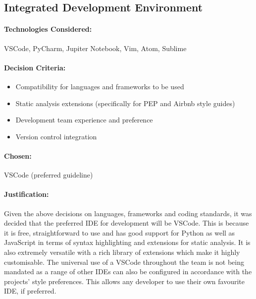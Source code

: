 \begin{spacing}{1.3}
\subsection{Integrated Development Environment}
\paragraph{Technologies Considered:}
VSCode, PyCharm, Jupiter Notebook, Vim, Atom, Sublime
\paragraph{Decision Criteria:}
\begin{itemize}
\item Compatibility for languages and frameworks to be used
\item Static analysis extensions (specifically for PEP and Airbnb style guides)
\item Development team experience and preference
\item Version control integration
\end{itemize}

\paragraph{Chosen:}
VSCode (preferred guideline)

\paragraph{Justification:}
Given the above decisions on languages, frameworks and coding standards, it was decided that the preferred IDE for development will be VSCode. This is because it is free, straightforward to use and has good support for Python as well as JavaScript in terms of syntax highlighting and extensions for static analysis. It is also extremely versatile with a rich library of extensions which make it highly customisable. The universal use of a VSCode throughout the team is not being mandated as a range of other IDEs can also be configured in accordance with the projects' style preferences. This allows any developer to use their own favourite IDE, if preferred.
\end{spacing}